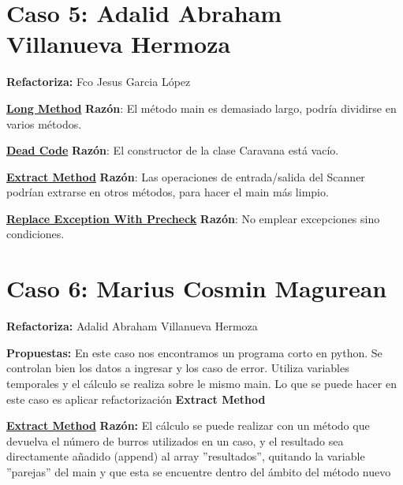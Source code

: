 \documentclass[11pt,a4paper,oneside]{book}
\begin{document}
\chapter {Caso 5: Adalid Abraham Villanueva Hermoza}
    \textbf{Refactoriza:} Fco Jesus Garcia López
    
    \hyperref[longmethod]{\textbf{Long Method}}
    \newline
    \textbf{Razón}: El método main es demasiado largo, podría dividirse en varios métodos.
    
    
    \hyperref[deadcode]{\textbf{Dead Code}}
    \newline
    \textbf{Razón}: El constructor de la clase Caravana está vacío.
    
    
    \hyperref[extractmethod]{\textbf{Extract Method}}
    \newline
    \textbf{Razón}: Las operaciones de entrada/salida del Scanner podrían extrarse en otros métodos, para hacer el main más limpio.
    
    
    \hyperref[replaceExceptionWithPrecheck]{\textbf{Replace Exception With Precheck}}
    \newline
    \textbf{Razón}: No emplear excepciones sino condiciones.
    

\chapter {Caso 6: Marius Cosmin Magurean}

\textbf{Refactoriza: } Adalid Abraham Villanueva Hermoza
    \newline
    
    \textbf{Propuestas: } En este caso nos encontramos un programa corto en python. Se controlan bien los datos a ingresar y los caso de error. Utiliza variables temporales y el cálculo se realiza sobre le mismo main. Lo que se puede hacer en este caso es aplicar refactorización \textbf{Extract Method}
    \newline

\hyperref[extractmethod]{\textbf{Extract Method}}
    \newline
    \textbf{Razón: } El cálculo se puede realizar con un método que devuelva el número de burros utilizados en un caso, y el resultado sea directamente añadido (append) al array ''resultados'', quitando la variable ''parejas'' del main y que esta se encuentre dentro del ámbito del método nuevo 
    
    
\end{document}

